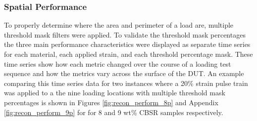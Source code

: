 \subsubsection{Spatial Performance}\label{sec:Spatial Performance2}
To properly determine where the area and perimeter of a load are, multiple threshold mask filters were applied. To validate the threshold mask percentages
 the three main performance characteristics were displayed as separate time series for each material, each applied strain, and each threshold percentage mask. These time series show how each metric changed over the course of a loading test sequence and how the metrics vary across the surface of the DUT. An example comparing this time series data for two instances where a 20\% strain pulse train was applied to a the nine loading locations with multiple threshold mask percentages is shown in Figures \ref{fig:recon_perform_8p} and Appendix \ref{fig:recon_perform_9p} for for 8 and 9 wt\% CBSR samples respectively.
    
